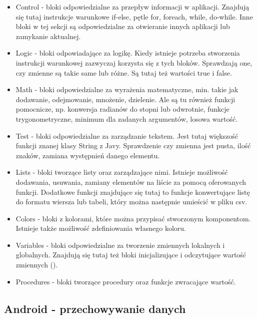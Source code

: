 \begin{itemize}

\item Control - bloki odpowiedzialne za przepływ informacji w aplikacji. Znajdują się tutaj instrukcje warunkowe if-else, pętle for, foreach, while, do-while. Inne bloki w tej sekcji są odpowiedzialne za otwieranie innych aplikacji lub zamykanie aktualnej.

\item Logic - bloki odpowiadające za logikę. Kiedy istnieje potrzeba stworzenia instrukcji warunkowej zazwyczaj korzysta się z tych bloków. Sprawdzają one, czy zmienne są takie same lub różne. Są tutaj też wartości true i false.

\item Math - bloki odpowiedzialne za wyrażenia matematyczne, min. takie jak dodawanie, odejmowanie, mnożenie, dzielenie. Ale są tu również funkcji pomocnicze, np. konwersja radianów do stopni lub odwrotnie, funkcje trygonometryczne, minimum dla zadanych argumentów, losowa wartość.

\item Test - bloki odpowiedzialne za zarządzanie tekstem. Jest tutaj większość funkcji znanej klasy String z Javy. Sprawdzenie czy zmienna jest pusta, ilość znaków, zamiana występnień danego elementu.

\item Lists - bloki tworzące listy oraz zarządzające nimi. Istnieje możliwość dodawania, usuwania, zamiany elementów na liście za pomocą oferowanych funkcji. Dodatkowe funkcji znajdujące się tutaj to funkcje konwertujące listę do formatu wiersza lub tabeli, który można następnie umieścić w pliku csv.

\item Colors - bloki z kolorami, które można przypisać stworzonym komponentom. Istnieje także możliwość zdefiniowania własnego koloru.

\item Variables - bloki odpowiedzialne za tworzenie zmiennych lokalnych i globalnych. Znajdują się tutaj też bloki inicjalizujące i odczytujące wartość zmiennych ().

\item Procedures - bloki tworzące procedury oraz funkcje zwracające wartość.

\end{itemize}

\subsection{Android - przechowywanie danych}

